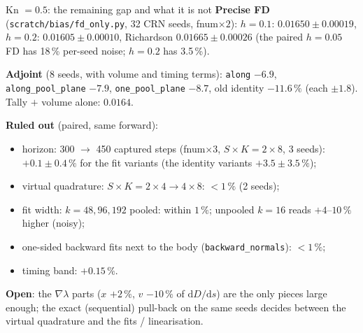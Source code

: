 \documentclass[10pt,aspectratio=169]{beamer}
\newcommand{\dd}{\mathrm{d}}
\newcommand{\code}[1]{\texttt{\small #1}}
\begin{document}
\begin{frame}{Kn $=0.5$: the remaining gap and what it is not}
\textbf{Precise FD} (\code{scratch/bias/fd\_only.py}, 32 CRN seeds, fnum$\times2$): $h = 0.1$:
$0.01650\pm0.00019$, $h = 0.2$: $0.01605\pm0.00010$, Richardson $0.01665\pm0.00026$ (the
paired $h = 0.05$ FD has 18\,\% per-seed noise; $h = 0.2$ has 3.5\,\%).

\medskip
\textbf{Adjoint} (8 seeds, with volume and timing terms): \code{along} $-6.9$, \code{along\_pool\_plane}
$-7.9$, \code{one\_pool\_plane} $-8.7$, old identity $-11.6\,\%$ (each $\pm1.8$).  Tally
$+$ volume alone: $0.0164$.

\medskip
\textbf{Ruled out} (paired, same forward):
\begin{itemize}
\item horizon: 300 $\to$ 450 captured steps (fnum$\times3$, $S\times K = 2\times8$, 3 seeds):
  $+0.1\pm0.4\,\%$ for the fit variants (the identity variants $+3.5\pm3.5\,\%$);
\item virtual quadrature: $S\times K = 2\times4 \to 4\times8$: $<1\,\%$ (2 seeds);
\item fit width: $k = 48, 96, 192$ pooled: within $1\,\%$; unpooled $k = 16$ reads
  $+4$--$10\,\%$ higher (noisy);
\item one-sided backward fits next to the body (\code{backward\_normals}): $<1\,\%$;
\item timing band: $+0.15\,\%$.
\end{itemize}
\textbf{Open}: the $\nabla\lambda$ parts ($x$ $+2\,\%$, $v$ $-10\,\%$ of $\dd D/\dd s$) are the only
pieces large enough; the exact (sequential) pull-back on the same seeds decides between the
virtual quadrature and the fits / linearisation.
\end{frame}
\end{document}
